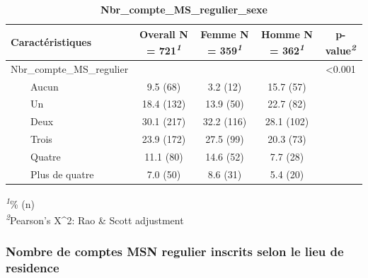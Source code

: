 \documentclass[
]{article}
\begin{document}
\newpage
\begin{table}[!t]
\caption{\label{tab:unnamed-chunk-49}\textbf{Nbr\_compte\_MS\_regulier\_sexe}} 
\fontsize{12.0pt}{14.4pt}\selectfont
\begin{tabular*}{\linewidth}{@{\extracolsep{\fill}}lcccc}
\toprule
\textbf{Caractéristiques} & \textbf{Overall}  N = 721\textsuperscript{\textit{1}} & \textbf{Femme}  N = 359\textsuperscript{\textit{1}} & \textbf{Homme}  N = 362\textsuperscript{\textit{1}} & \textbf{p-value}\textsuperscript{\textit{2}} \\ 
\midrule\addlinespace[2.5pt]
Nbr\_compte\_MS\_regulier &  &  &  & <0.001 \\ 
    Aucun & 9.5 (68) & 3.2 (12) & 15.7 (57) &  \\ 
    Un & 18.4 (132) & 13.9 (50) & 22.7 (82) &  \\ 
    Deux & 30.1 (217) & 32.2 (116) & 28.1 (102) &  \\ 
    Trois & 23.9 (172) & 27.5 (99) & 20.3 (73) &  \\ 
    Quatre & 11.1 (80) & 14.6 (52) & 7.7 (28) &  \\ 
    Plus de quatre & 7.0 (50) & 8.6 (31) & 5.4 (20) &  \\ 
\bottomrule
\end{tabular*}
\begin{minipage}{\linewidth}
\textsuperscript{\textit{1}}\% (n)\\
\textsuperscript{\textit{2}}Pearson's X\^{}2: Rao \& Scott adjustment\\
\end{minipage}
\end{table}
\vspace{1cm}

\hypertarget{nombre-de-comptes-msn-regulier-inscrits-selon-le-lieu-de-residence}{%
\subsubsection{Nombre de comptes MSN regulier inscrits selon le lieu de
residence}\label{nombre-de-comptes-msn-regulier-inscrits-selon-le-lieu-de-residence}}
\end{document}
